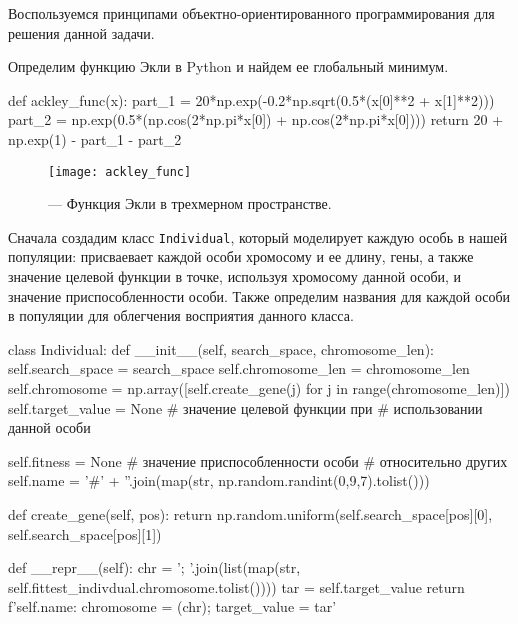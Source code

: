 Воспользуемся принципами объектно-ориентированного программирования для решения данной задачи.

Определим функцию Экли в Python и найдем ее глобальный минимум.
\begin{pyin}
def ackley_func(x):
   part_1 = 20*np.exp(-0.2*np.sqrt(0.5*(x[0]**2 + x[1]**2)))
   part_2 = np.exp(0.5*(np.cos(2*np.pi*x[0]) + np.cos(2*np.pi*x[0])))
   return 20 + np.exp(1) - part_1 - part_2
\end{pyin}

\begin{figure}[ht!]
 \centering
	\texttt{[image: ackley\_func]}
	\caption{ --- Функция Экли в трехмерном пространстве.}
	\label{img:ackley_func}
\end{figure}


Сначала создадим класс \texttt{Individual}, который моделирует каждую особь в нашей популяции: присваевает каждой особи хромосому и ее длину, гены, а также значение целевой функции в точке, используя хромосому данной особи, и значение приспособленности особи. Также определим названия для каждой особи в популяции для облегчения восприятия данного класса.
\begin{pyin}
class Individual:
  def __init__(self, search_space, chromosome_len):
    self.search_space = search_space
    self.chromosome_len = chromosome_len
    self.chromosome = np.array([self.create_gene(j)
                                for j in range(chromosome_len)])
    self.target_value = None # значение целевой функции при
    # использовании данной особи
\end{pyin}
\begin{pyprint}
    self.fitness = None # значение приспособленности особи
    # относительно других
    self.name = '#' + ''.join(map(str,
                                  np.random.randint(0,9,7).tolist()))

  def create_gene(self, pos):
    return np.random.uniform(self.search_space[pos][0],
                             self.search_space[pos][1])

  def __repr__(self):
	  chr = '; '.join(list(map(str,
                    self.fittest_indivdual.chromosome.tolist())))
    tar = self.target_value
    return f'{self.name}: chromosome = {(chr)}; target_value = {tar}'
\end{pyprint}

